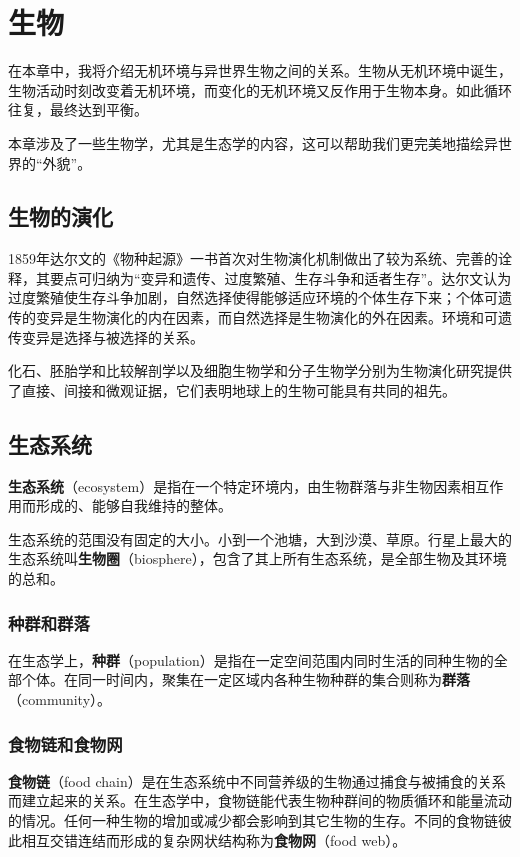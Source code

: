 \chapter{生物}
在本章中，我将介绍无机环境与异世界生物之间的关系。生物从无机环境中诞生，生物活动时刻改变着无机环境，而变化的无机环境又反作用于生物本身。如此循环往复，最终达到平衡。

本章涉及了一些生物学，尤其是生态学的内容，这可以帮助我们更完美地描绘异世界的“外貌”。

\section{生物的演化}
1859年达尔文的《物种起源》一书首次对生物演化机制做出了较为系统、完善的诠释，其要点可归纳为“变异和遗传、过度繁殖、生存斗争和适者生存”。达尔文认为过度繁殖使生存斗争加剧，自然选择使得能够适应环境的个体生存下来；个体可遗传的变异是生物演化的内在因素，而自然选择是生物演化的外在因素。环境和可遗传变异是选择与被选择的关系。

化石、胚胎学和比较解剖学以及细胞生物学和分子生物学分别为生物演化研究提供了直接、间接和微观证据，它们表明地球上的生物可能具有共同的祖先。

\section{生态系统}
\textbf{生态系统}（ecosystem）是指在一个特定环境内，由生物群落与非生物因素相互作用而形成的、能够自我维持的整体。

生态系统的范围没有固定的大小。小到一个池塘，大到沙漠、草原。行星上最大的生态系统叫\textbf{生物圈}（biosphere），包含了其上所有生态系统，是全部生物及其环境的总和。

\subsection{种群和群落}
在生态学上，\textbf{种群}（population）是指在一定空间范围内同时生活的同种生物的全部个体。在同一时间内，聚集在一定区域内各种生物种群的集合则称为\textbf{群落}（community）。

\subsection{食物链和食物网}
\textbf{食物链}（food chain）是在生态系统中不同营养级的生物通过捕食与被捕食的关系而建立起来的关系。在生态学中，食物链能代表生物种群间的物质循环和能量流动的情况。任何一种生物的增加或减少都会影响到其它生物的生存。不同的食物链彼此相互交错连结而形成的复杂网状结构称为\textbf{食物网}（food web）。

